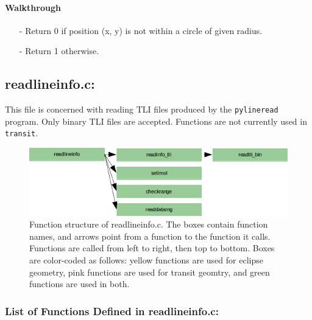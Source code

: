 \documentclass[letterpaper,12pt]{article}
\begin{document}
\paragraph{Walkthrough}
\begin{enumerate}[leftmargin=10pt, noitemsep, parsep=0pt, topsep=0ex]
\item[-] Return 0 if position (x, y) is not within a circle of given radius.
\item[-] Return 1 otherwise.
\end{enumerate}

\newpage
\subsection{readlineinfo.c:}
This file is concerned with reading TLI files produced by the {\tt pylineread} program. Only binary TLI files are accepted. Functions  are not currently used in {\tt transit}.


\begin{figure}
\includegraphics{fig/readlineinfoc}
\caption{Function structure of readlineinfo.c. The boxes contain function names, and arrows point from a function to the function it calls. Functions are called from left to right, then top to bottom.  Boxes are color-coded as follows:  yellow functions are used for eclipse geometry, pink functions are used for transit geomtry, and green functions are used in both.}
\label{fig:readlineinfoc}
\end{figure}

\subsubsection{List of Functions Defined in readlineinfo.c:}
 \newline
\end{document}

